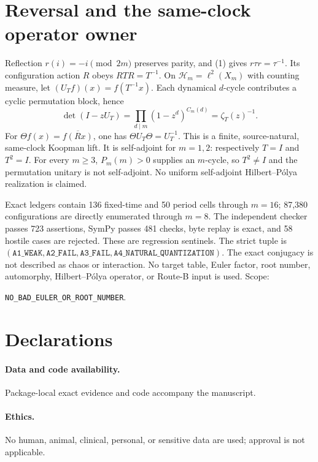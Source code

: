 \documentclass[10pt]{article}
\begin{document}
\section{Reversal and the same-clock operator owner}
Reflection $r(i)=-i\pmod{2m}$ preserves parity, and (1) gives
$r\tau r=\tau^{-1}$.  Its configuration action $R$ obeys
$RTR=T^{-1}$.  On $\mathcal H_m=\ell^2(X_m)$ with counting measure, let
$(U_Tf)(x)=f(T^{-1}x)$.  Each dynamical $d$-cycle contributes a cyclic
permutation block, hence
\begin{equation}
\det(I-zU_T)=\prod_{d\mid m}(1-z^d)^{C_m(d)}
=\zeta_T(z)^{-1}.                                            \tag{7}
\end{equation}
For $\Theta f(x)=\overline{f(Rx)}$, one has
$\Theta U_T\Theta=U_T^{-1}$.  This is a finite, source-natural, same-clock
Koopman lift.  It is self-adjoint for $m=1,2$: respectively $T=I$ and
$T^2=I$.  For every $m\ge3$, $P_m(m)>0$ supplies an $m$-cycle, so $T^2\ne I$
and the permutation unitary is not self-adjoint.  No uniform self-adjoint
Hilbert--P\'olya realization is claimed.

Exact ledgers contain 136 fixed-time and 50 period cells through $m=16$;
87{,}380 configurations are directly enumerated through $m=8$.  The
independent checker passes 723 assertions, SymPy passes 481 checks, byte
replay is exact, and 58 hostile cases are rejected.  These are regression
sentinels.  The strict tuple is
$(\texttt{A1\_WEAK},\texttt{A2\_FAIL},\texttt{A3\_FAIL},
\texttt{A4\_NATURAL\_QUANTIZATION})$.  The exact conjugacy is not described
as chaos or interaction.  No target table, Euler factor, root number,
automorphy, Hilbert--P\'olya operator, or Route-B input is used.  Scope:
\begin{center}\texttt{NO\_BAD\_EULER\_OR\_ROOT\_NUMBER}.\end{center}

\section*{Declarations}
\paragraph{Data and code availability.} Package-local exact evidence and
code accompany the manuscript.
\paragraph{Ethics.} No human, animal, clinical, personal, or sensitive data
are used; approval is not applicable.
\end{document}
